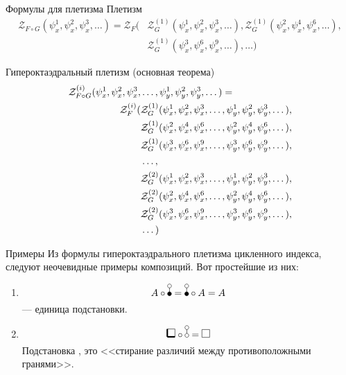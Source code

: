 \documentclass{beamer}
\begin{document}
\begin{frame}{Формулы для плетизма}
Плетизм
\begin{equation*}
\begin{split}
	\mathcal Z_{F \circ G} (\psi_x^1, \psi_x^2, \psi_x^3, \dots ) = \mathcal Z_F(
		&\mathcal Z^{(1)}_G(\psi_x^1, \psi_x^2, \psi_x^3, \dots), 
		\mathcal Z^{(1)}_G(\psi_x^2, \psi_x^4, \psi_x^6, \dots), \\ 
		&\mathcal Z^{(1)}_G(\psi_x^3, \psi_x^6, \psi_x^9, \dots), 
		\dots)
\end{split}
\end{equation*}

Гипероктаэдральный плетизм (основная теорема)
\begin{equation}
\begin{split}
\label{eq:h-zfg}
	\mathcal Z^{(i)}_{F \circ G} (\psi_x^1, \psi_x^2, \psi_x^3, &\dots, 
	\psi_y^1, \psi_y^2, \psi_y^3, \dots) = \\
	\mathcal Z_F^{(i)}(
		&\mathcal Z^{(1)}_G(\psi_x^1, \psi_x^2, \psi_x^3, \dots, 
					 \psi_y^1, \psi_y^2, \psi_y^3, \dots), \\
		&\mathcal Z^{(1)}_G(\psi_x^2, \psi_x^4, \psi_x^6, \dots, 
					 \psi_y^2, \psi_y^4, \psi_y^6, \dots), \\
		&\mathcal Z^{(1)}_G(\psi_x^3, \psi_x^6, \psi_x^9, \dots, 
					 \psi_y^3, \psi_y^6, \psi_y^9, \dots), \\
		&\dots, \\
		&\mathcal Z^{(2)}_G(\psi_x^1, \psi_x^2, \psi_x^3, \dots, 
					 \psi_y^1, \psi_y^2, \psi_y^3, \dots), \\
		&\mathcal Z^{(2)}_G(\psi_x^2, \psi_x^4, \psi_x^6, \dots, 
					 \psi_y^2, \psi_y^4, \psi_y^6, \dots), \\
		&\mathcal Z^{(2)}_G(\psi_x^3, \psi_x^6, \psi_x^9, \dots, 
					 \psi_y^3, \psi_y^6, \psi_y^9, \dots), \\
		&\dots
	)
\end{split}	
\end{equation}
\end{frame}

\begin{frame}{Примеры}
Из формулы гипероктаэдрального плетизма цикленного индекса, следуют
неочевидные примеры композиций. Вот простейшие из них:
\begin{enumerate}[(1)]
\item
$$A \circ \dB = \dB \circ A = A$$
\dB --- единица подстановки.
\item
$$\dBB \circ \dA = \dAA$$
Подстановка \dA, это <<стирание различий между противоположными
гранями>>.
\end{enumerate}
\end{frame}
\end{document}
